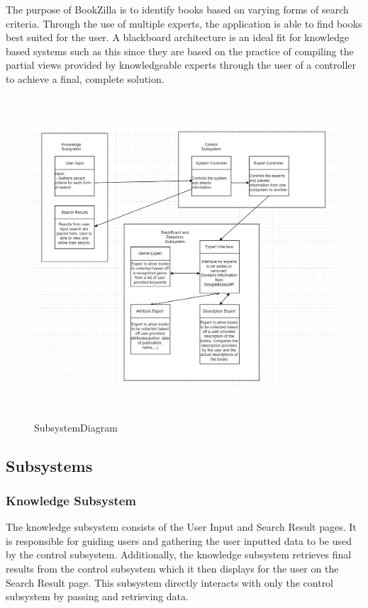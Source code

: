 \documentclass[12pt]{article}
\begin{document}
The purpose of BookZilla is to identify books based on varying forms of search criteria. Through the use of multiple experts, the application is able to find books best suited for the user. A blackboard architecture is an ideal fit for knowledge based systems such as this since they are based on the practice of compiling the partial views provided by knowledgeable experts through the user of a controller to achieve a final, complete solution.

\begin{figure}[h]
\centering
\includegraphics[height=120mm]{SubsystemDiagram.png}
\caption{SubsystemDiagram}
\label{fig:SubsystemDiagram}
\end{figure}


\subsection{Subsystems}
\label{sub:subsystems}
\subsubsection{Knowledge Subsystem}

The knowledge subsystem consists of the User Input and Search Result pages. It is responsible for guiding users and gathering the user inputted data to be used by the control subsystem. Additionally, the knowledge subsystem retrieves final results from the control subsystem which it then displays for the user on the Search Result page. This subsystem directly interacts with only the control subsystem by passing and retrieving data.
\end{document}
